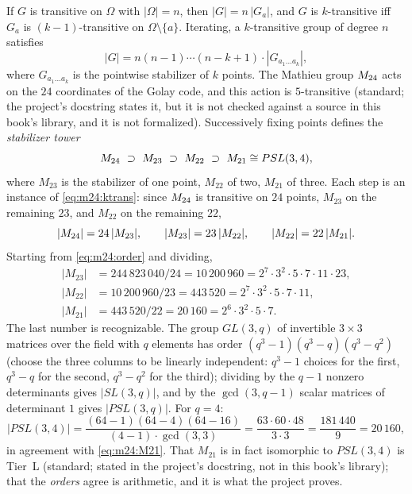 If $G$ is transitive on $\Omega$ with $|\Omega|=n$, then $|G|=n\,|G_a|$, and $G$ is
$k$-transitive iff $G_a$ is $(k-1)$-transitive on $\Omega\setminus\{a\}$. Iterating,
a $k$-transitive group of degree $n$ satisfies
\begin{equation}\label{eq:m24:ktrans}
 |G|=n(n-1)\cdots(n-k+1)\cdot|G_{a_1\dots a_k}| ,
\end{equation}
where $G_{a_1\dots a_k}$ is the pointwise stabilizer of $k$ points. The Mathieu group $M_{24}$
acts on the $24$ coordinates of the Golay code, and this action is $5$-transitive (standard;
the project's  docstring states it, but it is not checked against a
source in this book's library, and it is not formalized). Successively fixing points defines
the \emph{stabilizer tower}
\begin{equation}\label{eq:m24:tower}
 M_{24}\ \supset\ M_{23}\ \supset\ M_{22}\ \supset\ M_{21}\cong PSL(3,4),
\end{equation}
where $M_{23}$ is the stabilizer of one point, $M_{22}$ of two, $M_{21}$ of three. Each step
is an instance of \eqref{eq:m24:ktrans}: since $M_{24}$ is transitive on $24$ points,
$M_{23}$ on the remaining $23$, and $M_{22}$ on the remaining $22$,
\begin{equation}\label{eq:m24:indices}
 |M_{24}|=24\,|M_{23}|,\qquad |M_{23}|=23\,|M_{22}|,\qquad |M_{22}|=22\,|M_{21}| .
\end{equation}
Starting from \eqref{eq:m24:order} and dividing,
\begin{align}
 |M_{23}|&=244\,823\,040/24=10\,200\,960=2^7\cdot3^2\cdot5\cdot7\cdot11\cdot23,\label{eq:m24:M23}\\
 |M_{22}|&=10\,200\,960/23=443\,520=2^7\cdot3^2\cdot5\cdot7\cdot11,\label{eq:m24:M22}\\
 |M_{21}|&=443\,520/22=20\,160=2^6\cdot3^2\cdot5\cdot7.\label{eq:m24:M21}
\end{align}
The last number is recognizable. The group $GL(3,q)$ of invertible $3\times3$ matrices over
the field with $q$ elements has order $(q^3-1)(q^3-q)(q^3-q^2)$ (choose the three columns
to be linearly independent: $q^3-1$ choices for the first, $q^3-q$ for the second, $q^3-q^2$
for the third); dividing by the $q-1$ nonzero determinants gives $|SL(3,q)|$, and by the
$\gcd(3,q-1)$ scalar matrices of determinant $1$ gives $|PSL(3,q)|$. For $q=4$:
\begin{equation}\label{eq:m24:psl34}
 |PSL(3,4)|=\frac{(64-1)(64-4)(64-16)}{(4-1)\cdot\gcd(3,3)}=\frac{63\cdot60\cdot48}{3\cdot3}
 =\frac{181\,440}{9}=20\,160,
\end{equation}
in agreement with \eqref{eq:m24:M21}. That $M_{21}$ is in fact isomorphic to $PSL(3,4)$ is
Tier~L (standard; stated in the project's docstring, not in this book's library); that the
\emph{orders} agree is arithmetic, and it is what the project proves.

